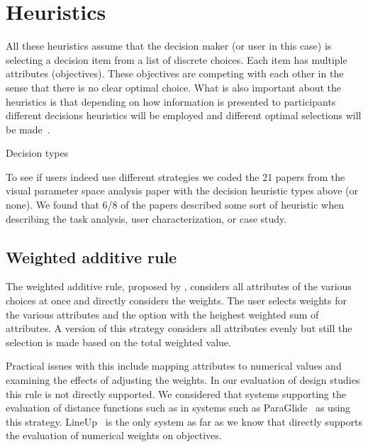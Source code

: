 \section{Heuristics}\label{heuristics}

All these heuristics assume that the decision maker (or user in this case)
is selecting a decision item from a list of discrete choices. Each item
has multiple attributes (objectives). These objectives are competing with
each other in the sense that there is no clear optimal choice. What is also
important about the heuristics is that depending on how information is 
presented to participants different decisions heuristics will be employed
and different optimal selections will be made~\citep{ref}.

\begin{table*}[tb]
  \begin{center}
    \caption{Decision types}
  \end{center}
\end{table*}

To see if users indeed use different strategies we coded the 21 papers
from the visual parameter space analysis paper \citep{Sedlmair:2014}
with the decision heuristic types above (or none). We found that 6/8 of
the papers described some sort of heuristic when describing the task
analysis, user characterization, or case study.


\subsection{Weighted additive rule}\label{weighted-additive-rule}

The weighted additive rule, proposed by , considers all
attributes of the various choices at once and directly considers 
the weights. The user selects weights for the various attributes and 
the option with the heighest weighted sum of attributes.
A version of this strategy considers all attributes evenly but still
the selection is made based on the total weighted value.

Practical issues with this include mapping attributes to numerical values
and examining the effects of adjusting the weights. In our evaluation of
design studies this rule is not directly supported. We considered that
systems supporting the evaluation of distance functions such as 
in systems such as ParaGlide~\citep{Bergner:2013} as using this strategy.
LineUp~\citep{Gratzl:2013} is the only system as far as we know that
directly supports the evaluation of numerical weights on objectives.

